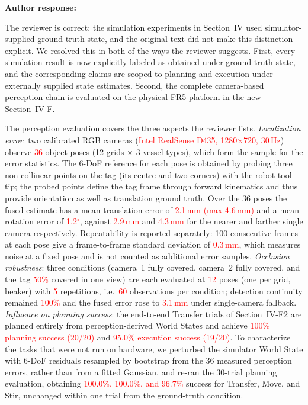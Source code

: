 \documentclass[11pt]{article}
\newcommand{\nd}[1]{\textcolor{red}{#1}}
\newenvironment{response}{\textbf{Author response:}\par\smallskip}{\par\medskip}
\begin{document}
\begin{response}
The reviewer is correct: the simulation experiments in Section~IV used simulator-supplied ground-truth state, and the original text did not make this distinction explicit.
We resolved this in both of the ways the reviewer suggests.
First, every simulation result is now explicitly labeled as obtained under ground-truth state, and the corresponding claims are scoped to planning and execution under externally supplied state estimates.
Second, the complete camera-based perception chain is evaluated on the physical FR5 platform in the new Section~IV-F.

The perception evaluation covers the three aspects the reviewer lists.
\emph{Localization error}: two calibrated RGB cameras (\nd{Intel RealSense D435, 1280$\times$720, 30\,Hz}) observe \nd{36} object poses (12 grids $\times$ 3 vessel types), which form the sample for the error statistics.
The 6-DoF reference for each pose is obtained by probing three non-collinear points on the tag (its centre and two corners) with the robot tool tip; the probed points define the tag frame through forward kinematics and thus provide orientation as well as translation ground truth.
Over the 36 poses the fused estimate has a mean translation error of \nd{2.1\,mm (max 4.6\,mm)} and a mean rotation error of \nd{1.2$^\circ$}, against \nd{2.9\,mm} and \nd{4.3\,mm} for the nearer and farther single camera respectively.
Repeatability is reported separately: 100 consecutive frames at each pose give a frame-to-frame standard deviation of \nd{0.3\,mm}, which measures noise at a fixed pose and is not counted as additional error samples.
\emph{Occlusion robustness}: three conditions (camera~1 fully covered, camera~2 fully covered, and the tag \nd{50\%} covered in one view) are each evaluated at \nd{12} poses (one per grid, beaker) with \nd{5} repetitions, i.e.\ \nd{60} observations per condition; detection continuity remained \nd{100\%} and the fused error rose to \nd{3.1\,mm} under single-camera fallback.
\emph{Influence on planning success}: the end-to-end Transfer trials of Section~IV-F2 are planned entirely from perception-derived World States and achieve \nd{100\% planning success (20/20)} and \nd{95.0\% execution success (19/20)}.
To characterize the tasks that were not run on hardware, we perturbed the simulator World State with 6-DoF residuals resampled by bootstrap from the 36 measured perception errors, rather than from a fitted Gaussian, and re-ran the 30-trial planning evaluation, obtaining \nd{100.0\%, 100.0\%, and 96.7\%} success for Transfer, Move, and Stir, unchanged within one trial from the ground-truth condition.
\end{response}
\end{document}
